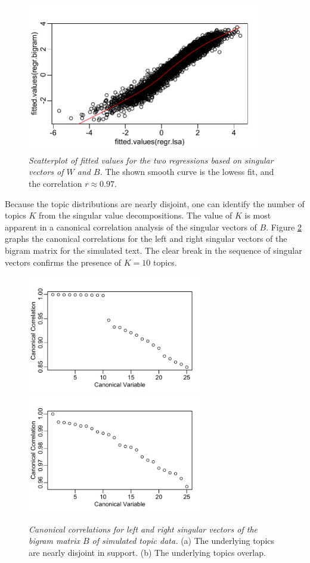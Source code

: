 \documentclass[10pt]{article}
\begin{document}
\begin{figure}
\caption{ \label{fig:simfits}  
{\sl Scatterplot of fitted values for the two regressions based on singular vectors of $W$ and $B$.}  The shown smooth curve is the lowess fit, and the correlation $r \approx 0.97$.}
\centerline{  \includegraphics[width=4in]{figures/simfits}  }
\end{figure}


Because the topic distributions are nearly disjoint, one can identify the number of topics $K$ from the singular value decompositions.  The value of $K$ is most apparent in a canonical correlation analysis of the singular vectors of $B$.  Figure \ref{fig:simccab} graphs the canonical correlations for the left and right singular vectors
of the bigram matrix for the simulated text.  The clear break in the sequence of singular vectors confirms the presence of $K=10$ topics.  

 \begin{figure}
  \caption{ \label{fig:simccab} { \sl Canonical correlations for left and right
 singular vectors of the bigram matrix $B$ of simulated topic data.} (a) The underlying topics are nearly disjoint in support. (b) The underlying topics overlap.}
\vspace{0.1in}
 \centerline{
      \includegraphics[width=3in]{figures/simccab}  
      \includegraphics[width=3in]{figures/simccabb}   }
  \end{figure}
 
\end{document}
